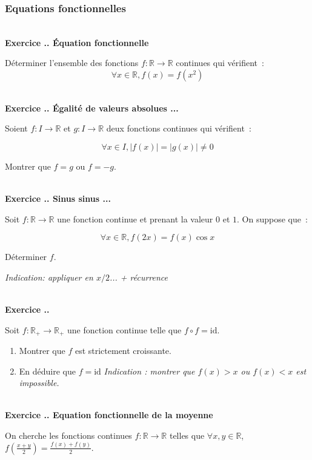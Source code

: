 \documentclass{article}
\newcommand{\mb}[1]{\mathbb{#1}}
\newcounter{exo}
\newcommand{\exercice}[1][\null]{\textbf{\\ Exercice \thesection.\theexo. #1} \addtocounter{exo}{1}}
\begin{document}
\subsubsection{Equations fonctionnelles}

\exercice[Équation fonctionnelle]

Déterminer l'ensemble des fonctions $f : \mb{R} \to \mb{R}$ continues 
qui vérifient~:
\begin{equation*}
    \forall x \in \mb{R}, f(x) = f (x^2)
\end{equation*}



\exercice[Égalité de valeurs absolues ...]

Soient $f : I \to \mb{R}$ et $g : I \to \mb{R}$ deux fonctions 
continues qui vérifient~:

\begin{equation*}
    \forall x \in I, | f(x) | = |g(x)| \neq 0
\end{equation*}

Montrer que $f = g$ ou $f = -g$.



\exercice[Sinus sinus ...]

Soit $f : \mb{R} \to \mb{R}$ une fonction continue et prenant la valeur $0$
et $1$. On suppose que~:

\begin{equation*}
    \forall x \in \mb{R}, f(2x) = f(x) \cos x
\end{equation*}

Déterminer $f$.

\emph{Indication: appliquer en $x/2$... + récurrence}

\exercice

Soit $f : \mb{R}_{+} \rightarrow \mb{R}_{+}$ une fonction continue telle que $f \circ f = \text{id}$.

\begin{enumerate}

\item Montrer que $f$ est strictement croissante.

\item En déduire que $f = \text{id}$ \emph{Indication : montrer que $f(x) > x$ ou $f(x) < x$ est impossible.}

\end{enumerate}

\exercice[Equation fonctionnelle de la moyenne]

On cherche les fonctions continues $f : \mb{R} \rightarrow \mb{R}$ telles que $\forall x,y \in \mb{R}$, $f(\frac{x+y}{2}) = \frac{f(x) +f(y)}{2}$.
\end{document}
